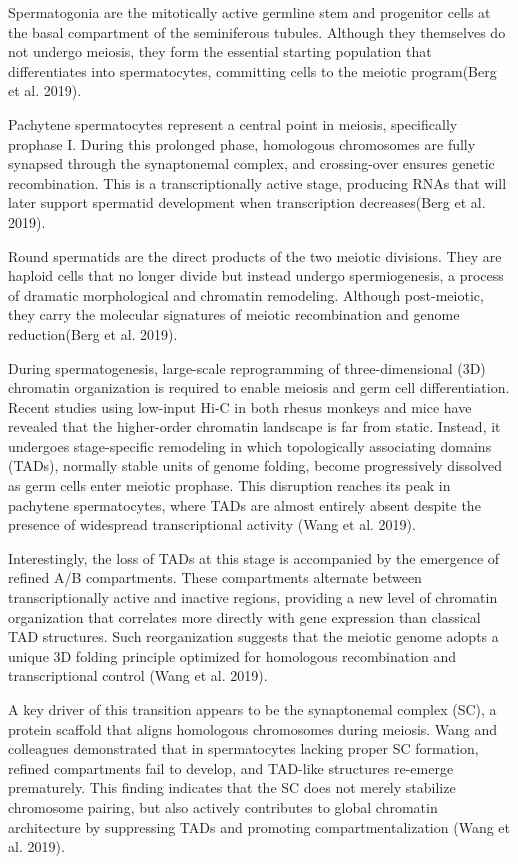 \documentclass[
  a4paper,
  openany]{scrbook}
\begin{document}
Spermatogonia are the mitotically active germline stem and progenitor
cells at the basal compartment of the seminiferous tubules. Although
they themselves do not undergo meiosis, they form the essential starting
population that differentiates into spermatocytes, committing cells to
the meiotic program(Berg et al. 2019).

Pachytene spermatocytes represent a central point in meiosis,
specifically prophase I. During this prolonged phase, homologous
chromosomes are fully synapsed through the synaptonemal complex, and
crossing-over ensures genetic recombination. This is a transcriptionally
active stage, producing RNAs that will later support spermatid
development when transcription decreases(Berg et al. 2019).

Round spermatids are the direct products of the two meiotic divisions.
They are haploid cells that no longer divide but instead undergo
spermiogenesis, a process of dramatic morphological and chromatin
remodeling. Although post-meiotic, they carry the molecular signatures
of meiotic recombination and genome reduction(Berg et al. 2019).

During spermatogenesis, large-scale reprogramming of three-dimensional
(3D) chromatin organization is required to enable meiosis and germ cell
differentiation. Recent studies using low-input Hi-C in both rhesus
monkeys and mice have revealed that the higher-order chromatin landscape
is far from static. Instead, it undergoes stage-specific remodeling in
which topologically associating domains (TADs), normally stable units of
genome folding, become progressively dissolved as germ cells enter
meiotic prophase. This disruption reaches its peak in pachytene
spermatocytes, where TADs are almost entirely absent despite the
presence of widespread transcriptional activity (Wang et al. 2019).

Interestingly, the loss of TADs at this stage is accompanied by the
emergence of refined A/B compartments. These compartments alternate
between transcriptionally active and inactive regions, providing a new
level of chromatin organization that correlates more directly with gene
expression than classical TAD structures. Such reorganization suggests
that the meiotic genome adopts a unique 3D folding principle optimized
for homologous recombination and transcriptional control (Wang et al.
2019).

A key driver of this transition appears to be the synaptonemal complex
(SC), a protein scaffold that aligns homologous chromosomes during
meiosis. Wang and colleagues demonstrated that in spermatocytes lacking
proper SC formation, refined compartments fail to develop, and TAD-like
structures re-emerge prematurely. This finding indicates that the SC
does not merely stabilize chromosome pairing, but also actively
contributes to global chromatin architecture by suppressing TADs and
promoting compartmentalization (Wang et al. 2019).
\end{document}
